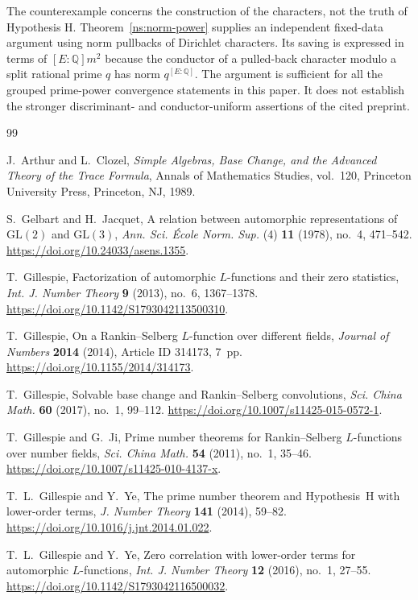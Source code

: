 \documentclass[11pt,reqno]{amsart}
\numberwithin{equation}{section}
\theoremstyle{definition}
\theoremstyle{remark}
\newcommand{\Q}{\mathbb Q}
\begin{document}
The counterexample concerns the construction of the characters, not the truth of Hypothesis H. Theorem~\ref{ns:norm-power} supplies an independent fixed-data argument using norm pullbacks of Dirichlet characters. Its saving is expressed in terms of $[E:\Q]m^2$ because the conductor of a pulled-back character modulo a split rational prime $q$ has norm $q^{[E:\Q]}$. The argument is sufficient for all the grouped prime-power convergence statements in this paper. It does not establish the stronger discriminant- and conductor-uniform assertions of the cited preprint.

\begin{thebibliography}{99}

J.~Arthur and L.~Clozel,
\emph{Simple Algebras, Base Change, and the Advanced Theory of the Trace Formula},
Annals of Mathematics Studies, vol.~120,
Princeton University Press, Princeton, NJ, 1989.

S.~Gelbart and H.~Jacquet,
A relation between automorphic representations of $\mathrm{GL}(2)$ and
$\mathrm{GL}(3)$,
\emph{Ann. Sci. \'Ecole Norm. Sup.} (4) \textbf{11} (1978), no.~4, 471--542.
\url{https://doi.org/10.24033/asens.1355}.

T.~Gillespie,
Factorization of automorphic $L$-functions and their zero statistics,
\emph{Int. J. Number Theory} \textbf{9} (2013), no.~6, 1367--1378.
\url{https://doi.org/10.1142/S1793042113500310}.

T.~Gillespie,
On a Rankin--Selberg $L$-function over different fields,
\emph{Journal of Numbers} \textbf{2014} (2014), Article ID 314173, 7~pp.
\url{https://doi.org/10.1155/2014/314173}.

T.~Gillespie,
Solvable base change and Rankin--Selberg convolutions,
\emph{Sci. China Math.} \textbf{60} (2017), no.~1, 99--112.
\url{https://doi.org/10.1007/s11425-015-0572-1}.

T.~Gillespie and G.~Ji,
Prime number theorems for Rankin--Selberg $L$-functions over number fields,
\emph{Sci. China Math.} \textbf{54} (2011), no.~1, 35--46.
\url{https://doi.org/10.1007/s11425-010-4137-x}.

T.~L.~Gillespie and Y.~Ye,
The prime number theorem and Hypothesis~H with lower-order terms,
\emph{J. Number Theory} \textbf{141} (2014), 59--82.
\url{https://doi.org/10.1016/j.jnt.2014.01.022}.

T.~L.~Gillespie and Y.~Ye,
Zero correlation with lower-order terms for automorphic $L$-functions,
\emph{Int. J. Number Theory} \textbf{12} (2016), no.~1, 27--55.
\url{https://doi.org/10.1142/S1793042116500032}.


\end{thebibliography}
\end{document}
